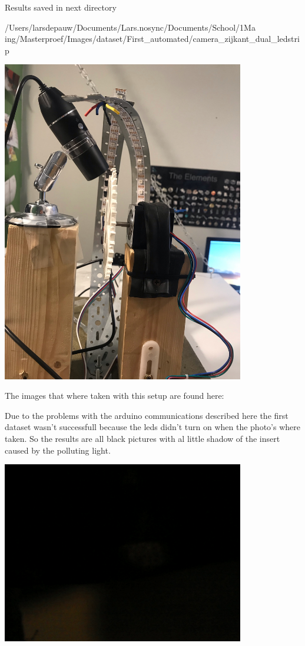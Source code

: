 Results saved in next directory

/Users/larsdepauw/Documents/Lars.nosync/Documents/School/1Ma ing/Masterproef/Images/dataset/First\_automated/camera\_zijkant\_dual\_ledstrip



\includegraphics[width=4.166667in, keepaspectratio=true]{./fig/Vision/Dataset/automated_datasets/1_check_camera_position/1_camera_position_side/achter2.jpeg}



The images that where taken with this setup are found here:

Due to the problems with the arduino communications described here the first dataset wasn't successfull because the leds didn't turn on when the photo's where taken. So the results are all black pictures with al little shadow of the insert caused by the polluting light. 



\includegraphics[width=4.166667in, keepaspectratio=true]{./fig/Vision/Dataset/automated_datasets/1_check_camera_position/1_camera_position_side/p3_l6_black.png}



